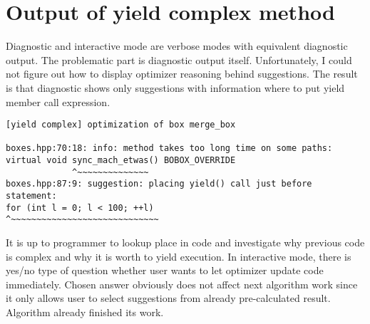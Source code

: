 \documentclass[12pt,a4paper]{report}
\let\openright=\clearpage
\begin{document}
\section{Output of yield complex method}
Diagnostic and interactive mode are verbose modes with equivalent diagnostic output. The problematic part is diagnostic output itself. Unfortunately, I could not figure out how to display optimizer reasoning behind suggestions. The result is that diagnostic shows only suggestions with information where to put yield member call expression.

{\footnotesize
\begin{verbatim}
[yield complex] optimization of box merge_box

boxes.hpp:70:18: info: method takes too long time on some paths:
virtual void sync_mach_etwas() BOBOX_OVERRIDE
             ^~~~~~~~~~~~~~~
boxes.hpp:87:9: suggestion: placing yield() call just before
statement:
for (int l = 0; l < 100; ++l)
^~~~~~~~~~~~~~~~~~~~~~~~~~~~~~
\end{verbatim}
}

It is up to programmer to lookup place in code and investigate why previous code is complex and why it is worth to yield execution. In interactive mode, there is yes/no type of question whether user wants to let optimizer update code immediately. Chosen answer obviously does not affect next algorithm work since it only allows user to select suggestions from already pre-calculated result. Algorithm already finished its work.

\openright
\end{document}
